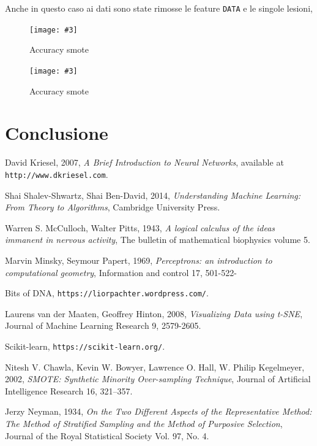 \documentclass[12pt, twoside, letterpaper]{report}
\newcommand{\img}[4] {
	\begin{figure}
		\centering
		\texttt{[image: \#3]}\\
		\caption{#1}
		\label{fig:#4}
	\end{figure}
}
\begin{document}
			Anche in questo caso ai dati sono state rimosse le feature \texttt{DATA} e le singole lesioni, 
			
			\img{Accuracy smote}{0.35}{accuracy_smote_1.png}{accuracy_smote_1}
			\img{Accuracy smote}{0.35}{accuracy_smote_2.png}{accuracy_smote_2}

	\chapter*{Conclusione}	  
	
	\begin{thebibliography}{9}
		 David Kriesel, 2007, \textit{A Brief Introduction to Neural Networks}, available at \texttt{http://www.dkriesel.com}.

		 Shai Shalev-Shwartz, Shai Ben-David, 2014, \textit{Understanding Machine Learning: From Theory to Algorithms}, Cambridge University Press.
		
		 Warren S. McCulloch, Walter Pitts, 1943, \textit{A logical calculus of the ideas immanent in nervous activity}, The bulletin of mathematical biophysics volume 5.		
		
		 Marvin Minsky, Seymour Papert, 1969,  \textit{Perceptrons: an introduction to computational geometry}, Information and control 17, 501-522- 
		
		 Bits of DNA, \texttt{https://liorpachter.wordpress.com/}.
		
		 Laurens van der Maaten, Geoffrey Hinton, 2008, \textit{Visualizing Data using t-SNE}, Journal of Machine Learning Research 9, 2579-2605.
		
		 Scikit-learn, \texttt{https://scikit-learn.org/}.
		
		 Nitesh V. Chawla, Kevin W. Bowyer, Lawrence O. Hall, W. Philip Kegelmeyer, 2002, \textit{SMOTE: Synthetic Minority Over-sampling Technique}, Journal of Artificial Intelligence Research 16, 321–357.
		
		 Jerzy Neyman, 1934, \textit{On the Two Different Aspects of the Representative Method: The Method of Stratified Sampling and the Method of Purposive Selection}, Journal of the Royal Statistical Society Vol. 97, No. 4.
		
	\end{thebibliography}
	
\end{document}
